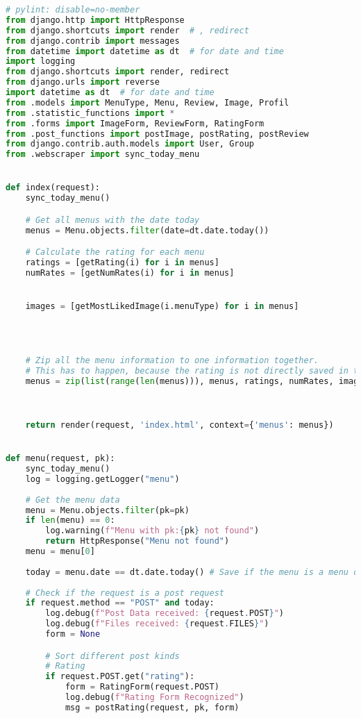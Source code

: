 \begin{lstlisting}[language=Python]
# pylint: disable=no-member
from django.http import HttpResponse
from django.shortcuts import render  # , redirect
from django.contrib import messages
from datetime import datetime as dt  # for date and time
import logging
from django.shortcuts import render, redirect
from django.urls import reverse
import datetime as dt  # for date and time
from .models import MenuType, Menu, Review, Image, Profil
from .statistic_functions import *
from .forms import ImageForm, ReviewForm, RatingForm
from .post_functions import postImage, postRating, postReview
from django.contrib.auth.models import User, Group
from .webscraper import sync_today_menu


def index(request):
    sync_today_menu()

    # Get all menus with the date today
    menus = Menu.objects.filter(date=dt.date.today())

    # Calculate the rating for each menu
    ratings = [getRating(i) for i in menus]
    numRates = [getNumRates(i) for i in menus]


    images = [getMostLikedImage(i.menuType) for i in menus]
    


    
    # Zip all the menu information to one information together.
    # This has to happen, because the rating is not directly saved in the database object.
    menus = zip(list(range(len(menus))), menus, ratings, numRates, images)

    

    return render(request, 'index.html', context={'menus': menus})


def menu(request, pk):
    sync_today_menu()
    log = logging.getLogger("menu")
    
    # Get the menu data
    menu = Menu.objects.filter(pk=pk)
    if len(menu) == 0:
        log.warning(f"Menu with pk:{pk} not found")
        return HttpResponse("Menu not found")
    menu = menu[0]
    
    today = menu.date == dt.date.today() # Save if the menu is a menu of today
    
    # Check if the request is a post request
    if request.method == "POST" and today:
        log.debug(f"Post Data received: {request.POST}")
        log.debug(f"Files received: {request.FILES}")
        form = None

        # Sort different post kinds
        # Rating
        if request.POST.get("rating"):
            form = RatingForm(request.POST)
            log.debug(f"Rating Form Recognized")
            msg = postRating(request, pk, form)


\end{lstlisting}
